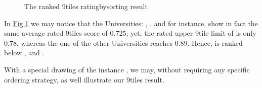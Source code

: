 \documentclass[a4paper,12pt,english]{sphinxhowto}
\let\sphinxpxdimen\pdfpxdimen\else\newdimen\sphinxpxdimen
\begin{document}
\begin{sphinxVerbatim}[commandchars=\\\{\}]
\end{sphinxVerbatim}

\begin{figure}[H]
\centering
\capstart

\noindent\sphinxincludegraphics[width=400\sphinxpxdimen]{{nineTilingOrdering}.png}
\caption{The ranked 9\sphinxhyphen{}tiles rating\sphinxhyphen{}by\sphinxhyphen{}sorting result}\label{\detokenize{tutorial:ninetilingordering}}\end{figure}

In \hyperref[\detokenize{tutorial:ninetilingordering}]{Fig.\@ \ref{\detokenize{tutorial:ninetilingordering}}} we may notice that the Universities: , ,  and  for instance, show in fact the same average rated 9\sphinxhyphen{}tiles score of 0.725; yet, the rated upper 9\sphinxhyphen{}tile limit of  is only 0.78, whereas the one of the other Universities reaches 0.89. Hence,  is ranked below ,  and  .

With a special  drawing of the  instance , we may, without requiring any specific ordering strategy, as well illustrate our 9\sphinxhyphen{}tiles  result.

\begin{sphinxVerbatim}[commandchars=\\\{\}]
\PYGZbs{}
\end{sphinxVerbatim}
\end{document}
